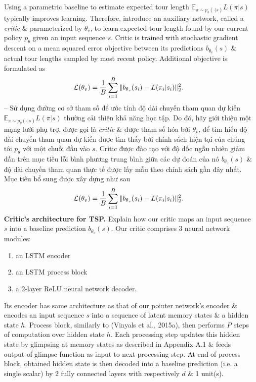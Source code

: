 \documentclass{article}
\begin{document}
\begin{itemize}
    Using a parametric baseline to estimate expected tour length $\mathbb{E}_{\pi\sim p_\theta(\cdot|s)} L(\pi|s)$ typically improves learning. Therefore, introduce an auxiliary network, called a {\it critic} \& parameterized by $\theta_v$, to learn expected tour length found by our current policy $p_\theta$ given an input sequence $s$. Critic is trained with stochastic gradient descent on a mean squared error objective between its predictions $b_{\theta_v}(s)$ \& actual tour lengths sampled by most recent policy. Additional objective is formulated as
    \begin{equation*}
        {\cal L}(\theta_v) = \frac{1}{B}\sum_{i=1}^B \|b_{\theta_v}(s_i) - L(\pi_i|s_i)\|_2^2.
    \end{equation*}
    -- Sử dụng đường cơ sở tham số để ước tính độ dài chuyến tham quan dự kiến $\mathbb{E}_{\pi\sim p_\theta(\cdot|s)} L(\pi|s)$ thường cải thiện khả năng học tập. Do đó, hãy giới thiệu một mạng lưới phụ trợ, được gọi là {\it critic} \& được tham số hóa bởi $\theta_v$, để tìm hiểu độ dài chuyến tham quan dự kiến được tìm thấy bởi chính sách hiện tại của chúng tôi $p_\theta$ với một chuỗi đầu vào $s$. Critic được đào tạo với độ dốc ngẫu nhiên giảm dần trên mục tiêu lỗi bình phương trung bình giữa các dự đoán của nó $b_{\theta_v}(s)$ \& độ dài chuyến tham quan thực tế được lấy mẫu theo chính sách gần đây nhất. Mục tiêu bổ sung được xây dựng như sau
    \begin{equation*}
        {\cal L}(\theta_v) = \frac{1}{B}\sum_{i=1}^B \|b_{\theta_v}(s_i) - L(\pi_i|s_i)\|_2^2.
    \end{equation*}
    {\bf Critic's architecture for TSP.} Explain how our critic maps an input sequence $s$ into a baseline prediction $b_{\theta_v}(s)$. Our critic comprises 3 neural network modules:
    \begin{enumerate}
        \item an LSTM encoder
        \item an LSTM process block
        \item a 2-layer ReLU neural network decoder.
    \end{enumerate}
    Its encoder has same architecture as that of our pointer network's encoder \& encodes an input sequence $s$ into a sequence of latent memory states \& a hidden state $h$. Process block, similarly to (Vinyals et al., 2015a), then performs $P$ steps of computation over hidden state $h$. Each processing step updates this hidden state by glimpsing at memory states as described in Appendix A.1 \& feeds output of glimpse function as input to next processing step. At end of process block, obtained hidden state is then decoded into a baseline prediction (i.e. a single scalar) by 2 fully connected layers with respectively $d$ \& 1 unit(s).
    

\end{itemize}
\end{document}
